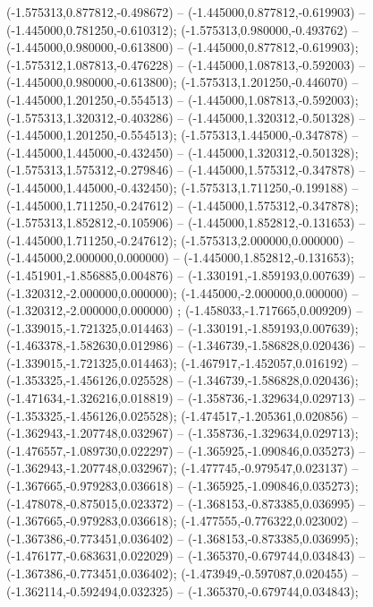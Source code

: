  (-1.575313,0.877812,-0.498672) -- (-1.445000,0.877812,-0.619903) -- (-1.445000,0.781250,-0.610312);
 (-1.575313,0.980000,-0.493762) -- (-1.445000,0.980000,-0.613800) -- (-1.445000,0.877812,-0.619903);
 (-1.575312,1.087813,-0.476228) -- (-1.445000,1.087813,-0.592003) -- (-1.445000,0.980000,-0.613800);
 (-1.575313,1.201250,-0.446070) -- (-1.445000,1.201250,-0.554513) -- (-1.445000,1.087813,-0.592003);
 (-1.575313,1.320312,-0.403286) -- (-1.445000,1.320312,-0.501328) -- (-1.445000,1.201250,-0.554513);
 (-1.575313,1.445000,-0.347878) -- (-1.445000,1.445000,-0.432450) -- (-1.445000,1.320312,-0.501328);
 (-1.575313,1.575312,-0.279846) -- (-1.445000,1.575312,-0.347878) -- (-1.445000,1.445000,-0.432450);
 (-1.575313,1.711250,-0.199188) -- (-1.445000,1.711250,-0.247612) -- (-1.445000,1.575312,-0.347878);
 (-1.575313,1.852812,-0.105906) -- (-1.445000,1.852812,-0.131653) -- (-1.445000,1.711250,-0.247612);
 (-1.575313,2.000000,0.000000) -- (-1.445000,2.000000,0.000000) -- (-1.445000,1.852812,-0.131653);
 (-1.451901,-1.856885,0.004876) -- (-1.330191,-1.859193,0.007639) -- (-1.320312,-2.000000,0.000000);
 (-1.445000,-2.000000,0.000000) -- (-1.320312,-2.000000,0.000000) ;
 (-1.458033,-1.717665,0.009209) -- (-1.339015,-1.721325,0.014463) -- (-1.330191,-1.859193,0.007639);
 (-1.463378,-1.582630,0.012986) -- (-1.346739,-1.586828,0.020436) -- (-1.339015,-1.721325,0.014463);
 (-1.467917,-1.452057,0.016192) -- (-1.353325,-1.456126,0.025528) -- (-1.346739,-1.586828,0.020436);
 (-1.471634,-1.326216,0.018819) -- (-1.358736,-1.329634,0.029713) -- (-1.353325,-1.456126,0.025528);
 (-1.474517,-1.205361,0.020856) -- (-1.362943,-1.207748,0.032967) -- (-1.358736,-1.329634,0.029713);
 (-1.476557,-1.089730,0.022297) -- (-1.365925,-1.090846,0.035273) -- (-1.362943,-1.207748,0.032967);
 (-1.477745,-0.979547,0.023137) -- (-1.367665,-0.979283,0.036618) -- (-1.365925,-1.090846,0.035273);
 (-1.478078,-0.875015,0.023372) -- (-1.368153,-0.873385,0.036995) -- (-1.367665,-0.979283,0.036618);
 (-1.477555,-0.776322,0.023002) -- (-1.367386,-0.773451,0.036402) -- (-1.368153,-0.873385,0.036995);
 (-1.476177,-0.683631,0.022029) -- (-1.365370,-0.679744,0.034843) -- (-1.367386,-0.773451,0.036402);
 (-1.473949,-0.597087,0.020455) -- (-1.362114,-0.592494,0.032325) -- (-1.365370,-0.679744,0.034843);
